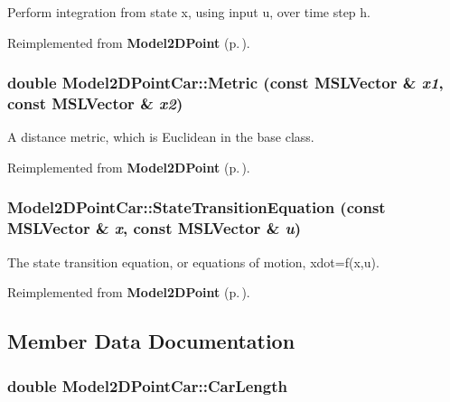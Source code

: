 Perform integration from state x, using input u, over time step h.



Reimplemented from {\bf Model2DPoint} {\rm (p.\,\pageref{classModel2DPoint_a2})}.
\subsubsection{\setlength{\rightskip}{0pt plus 5cm}double Model2DPoint\-Car::Metric (const {\bf MSLVector} \& {\em x1}, const {\bf MSLVector} \& {\em x2})\hspace{0.3cm}{\tt  [virtual]}}\label{classModel2DPointCar_a4}


A distance metric, which is Euclidean in the base class.



Reimplemented from {\bf Model2DPoint} {\rm (p.\,\pageref{classModel2DPoint_a4})}.
\subsubsection{ Model2DPoint\-Car::State\-Transition\-Equation (const {\bf MSLVector} \& {\em x}, const {\bf MSLVector} \& {\em u})\hspace{0.3cm}{\tt  [virtual]}}\label{classModel2DPointCar_a3}


The state transition equation, or equations of motion, xdot=f(x,u).



Reimplemented from {\bf Model2DPoint} {\rm (p.\,\pageref{classModel2DPoint_a3})}.

\subsection{Member Data Documentation}
\subsubsection{\setlength{\rightskip}{0pt plus 5cm}double Model2DPoint\-Car::Car\-Length}\label{classModel2DPointCar_m1}


